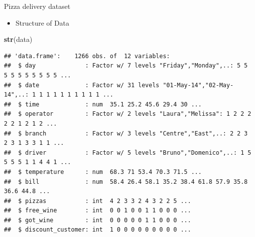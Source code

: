 \documentclass[ignorenonframetext,]{beamer}
\newenvironment{Shaded}{\begin{snugshade}}{\end{snugshade}}
\newcommand{\KeywordTok}[1]{\textcolor[rgb]{0.13,0.29,0.53}{\textbf{#1}}}
\newcommand{\NormalTok}[1]{#1}
\providecommand{\tightlist}{%
  \setlength{\itemsep}{0pt}\setlength{\parskip}{0pt}}
\begin{document}
\begin{frame}[fragile]{Pizza delivery dataset}

\begin{itemize}
\tightlist
\item
  Structure of Data
\end{itemize}

\begin{Shaded}
\begin{Highlighting}[]
\KeywordTok{str}\NormalTok{(data)}
\end{Highlighting}
\end{Shaded}

\begin{verbatim}
## 'data.frame':    1266 obs. of  12 variables:
##  $ day              : Factor w/ 7 levels "Friday","Monday",..: 5 5 5 5 5 5 5 5 5 5 ...
##  $ date             : Factor w/ 31 levels "01-May-14","02-May-14",..: 1 1 1 1 1 1 1 1 1 1 ...
##  $ time             : num  35.1 25.2 45.6 29.4 30 ...
##  $ operator         : Factor w/ 2 levels "Laura","Melissa": 1 2 2 2 2 2 1 2 1 2 ...
##  $ branch           : Factor w/ 3 levels "Centre","East",..: 2 2 3 2 3 1 3 3 1 1 ...
##  $ driver           : Factor w/ 5 levels "Bruno","Domenico",..: 1 5 5 5 5 1 1 4 4 1 ...
##  $ temperature      : num  68.3 71 53.4 70.3 71.5 ...
##  $ bill             : num  58.4 26.4 58.1 35.2 38.4 61.8 57.9 35.8 36.6 44.8 ...
##  $ pizzas           : int  4 2 3 3 2 4 3 2 2 5 ...
##  $ free_wine        : int  0 0 1 0 0 1 1 0 0 0 ...
##  $ got_wine         : int  0 0 0 0 0 1 1 0 0 0 ...
##  $ discount_customer: int  1 0 0 0 0 0 0 0 0 0 ...
\end{verbatim}

\end{frame}
\end{document}
